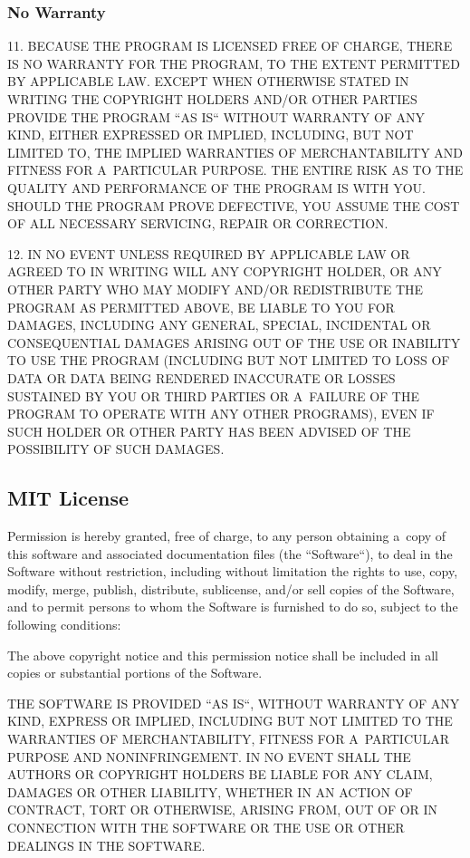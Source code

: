 \documentclass[a4paper, 11pt, twoside]{article}
\begin{document}
\subsubsection{No Warranty}

11. BECAUSE THE PROGRAM IS LICENSED FREE OF CHARGE, THERE IS NO WARRANTY FOR THE PROGRAM, TO THE EXTENT PERMITTED BY APPLICABLE LAW. EXCEPT WHEN OTHERWISE STATED IN WRITING THE COPYRIGHT HOLDERS AND/OR OTHER PARTIES PROVIDE THE PROGRAM “AS IS“ WITHOUT WARRANTY OF ANY KIND, EITHER EXPRESSED OR IMPLIED, INCLUDING, BUT NOT LIMITED TO, THE IMPLIED WARRANTIES OF MERCHANTABILITY AND FITNESS FOR A~PARTICULAR PURPOSE. THE ENTIRE RISK AS TO THE QUALITY AND PERFORMANCE OF THE PROGRAM IS WITH YOU. SHOULD THE PROGRAM PROVE DEFECTIVE, YOU ASSUME THE COST OF ALL NECESSARY SERVICING, REPAIR OR CORRECTION.

12. IN NO EVENT UNLESS REQUIRED BY APPLICABLE LAW OR AGREED TO IN WRITING WILL ANY COPYRIGHT HOLDER, OR ANY OTHER PARTY WHO MAY MODIFY AND/OR REDISTRIBUTE THE PROGRAM AS PERMITTED ABOVE, BE LIABLE TO YOU FOR DAMAGES, INCLUDING ANY GENERAL, SPECIAL, INCIDENTAL OR CONSEQUENTIAL DAMAGES ARISING OUT OF THE USE OR INABILITY TO USE THE PROGRAM (INCLUDING BUT NOT LIMITED TO LOSS OF DATA OR DATA BEING RENDERED INACCURATE OR LOSSES SUSTAINED BY YOU OR THIRD PARTIES OR A~FAILURE OF THE PROGRAM TO OPERATE WITH ANY OTHER PROGRAMS), EVEN IF SUCH HOLDER OR OTHER PARTY HAS BEEN ADVISED OF THE POSSIBILITY OF SUCH DAMAGES.

\subsection{MIT License}

Permission is hereby granted, free of charge, to any person obtaining a~copy of this software and associated documentation files (the “Software“), to deal in the Software without restriction, including without limitation the rights to use, copy, modify, merge, publish, distribute, sublicense, and/or sell copies of the Software, and to permit persons to whom the Software is furnished to do so, subject to the following conditions:

The above copyright notice and this permission notice shall be included in all copies or substantial portions of the Software.

THE SOFTWARE IS PROVIDED “AS IS“, WITHOUT WARRANTY OF ANY KIND, EXPRESS OR IMPLIED, INCLUDING BUT NOT LIMITED TO THE WARRANTIES OF MERCHANTABILITY, FITNESS FOR A~PARTICULAR PURPOSE AND NONINFRINGEMENT. IN NO EVENT SHALL THE AUTHORS OR COPYRIGHT HOLDERS BE LIABLE FOR ANY CLAIM, DAMAGES OR OTHER LIABILITY, WHETHER IN AN ACTION OF CONTRACT, TORT OR OTHERWISE, ARISING FROM, OUT OF OR IN CONNECTION WITH THE SOFTWARE OR THE USE OR OTHER DEALINGS IN THE SOFTWARE.
\end{document}
